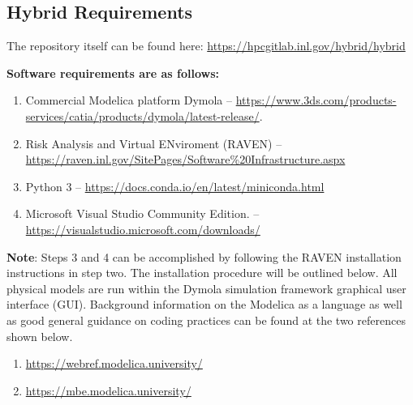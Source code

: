 \subsection{Hybrid Requirements}


The repository itself can be found here: \url{https://hpcgitlab.inl.gov/hybrid/hybrid}
 
\textbf{Software requirements are as follows:}

\begin{enumerate}
\item Commercial Modelica platform Dymola -- \url{https://www.3ds.com/products-services/catia/products/dymola/latest-release/}.
\item Risk Analysis and Virtual ENviroment (RAVEN) -- \url{https://raven.inl.gov/SitePages/Software%20Infrastructure.aspx}
\item Python 3 -- \url{https://docs.conda.io/en/latest/miniconda.html}
\item Microsoft Visual Studio Community Edition. -- \url{https://visualstudio.microsoft.com/downloads/}
\end{enumerate}

	

\textbf{Note}: Steps 3 and 4 can be accomplished by following the RAVEN installation instructions in step two. The installation procedure will be outlined below. 
All physical models are run within the Dymola simulation framework graphical user interface (GUI).  Background information on the Modelica as a language as well as good general guidance on coding practices can be found at the two references shown below. 
\begin{enumerate}
\item \url{https://webref.modelica.university/}
\item \url{https://mbe.modelica.university/}
\end{enumerate}
